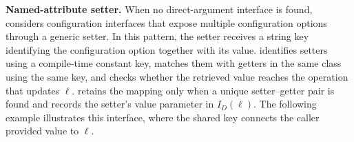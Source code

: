 
\noindent\textbf{Named-attribute setter.}
When no direct-argument interface is found, \sys considers configuration interfaces that expose multiple configuration options through a generic setter. In this pattern, the setter receives a string key identifying the configuration option together with its value. \sys identifies setters using a compile-time constant key, matches them with getters in the same class using the same key, and checks whether the retrieved value reaches the operation that updates $\ell$. \sys retains the mapping only when a unique setter--getter pair is found and records the setter's value parameter in $I_D(\ell)$. The following example illustrates this interface, where the shared key connects the caller provided value to $\ell$.




